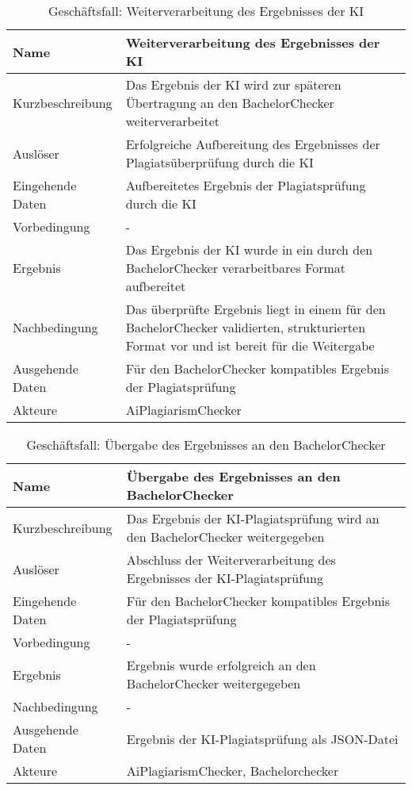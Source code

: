 \begin{table}[H]
    \begin{tabularx}{\textwidth}{|l|X|}
        \hline
        \textbf{Name} & \textbf{Weiterverarbeitung des Ergebnisses der KI} \\
        \hline
        Kurzbeschreibung & Das Ergebnis der KI wird zur späteren Übertragung an den BachelorChecker weiterverarbeitet \\
        \hline
        Auslöser & Erfolgreiche Aufbereitung des Ergebnisses der Plagiatsüberprüfung durch die KI \\
        \hline
        Eingehende Daten & Aufbereitetes Ergebnis der Plagiatsprüfung durch die KI \\
        \hline
        Vorbedingung & - \\
        \hline
        Ergebnis & Das Ergebnis der KI wurde in ein durch den BachelorChecker verarbeitbares Format aufbereitet \\
        \hline
        Nachbedingung & Das überprüfte Ergebnis liegt in einem für den BachelorChecker validierten, strukturierten Format vor und ist bereit für die Weitergabe \\
        \hline
        Ausgehende Daten & Für den BachelorChecker kompatibles Ergebnis der Plagiatsprüfung \\
        \hline
        Akteure & AiPlagiarismChecker \\
        \hline
    \end{tabularx}
    \caption{Geschäftsfall: Weiterverarbeitung des Ergebnisses der KI}
    \label{tab:weiterverarbeitung-des-ergebnisses-der-ki}
\end{table}


\begin{table}[H]
    \begin{tabularx}{\textwidth}{|l|X|}
        \hline
        \textbf{Name} & \textbf{Übergabe des Ergebnisses an den BachelorChecker} \\
        \hline
        Kurzbeschreibung & Das Ergebnis der KI-Plagiatsprüfung wird an den BachelorChecker weitergegeben \\
        \hline
        Auslöser & Abschluss der Weiterverarbeitung des Ergebnisses der KI-Plagiatsprüfung \\
        \hline
        Eingehende Daten & Für den BachelorChecker kompatibles Ergebnis der Plagiatsprüfung \\
        \hline
        Vorbedingung & - \\
        \hline
        Ergebnis & Ergebnis wurde erfolgreich an den BachelorChecker weitergegeben \\
        \hline
        Nachbedingung & - \\
        \hline
        Ausgehende Daten & Ergebnis der KI-Plagiatsprüfung als JSON-Datei \\
        \hline
        Akteure & AiPlagiarismChecker, Bachelorchecker \\
        \hline
    \end{tabularx}
    \caption{Geschäftsfall: Übergabe des Ergebnisses an den BachelorChecker}
    \label{tab:ubergabe-des-ergebnisses-an-den-bachelorchecker}
\end{table}

